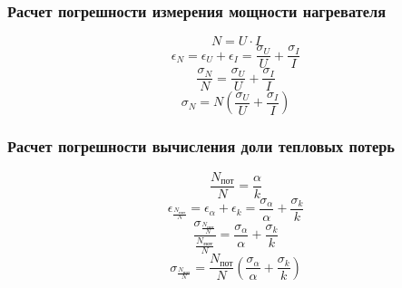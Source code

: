 \subsubsection{Расчет погрешности измерения мощности нагревателя}
\[N = U \cdot I\]
\[\epsilon_N = \epsilon_U + \epsilon_I = \frac{\sigma_U}{U} + \frac{\sigma_I}{I}\]
\[\frac{\sigma_N}{N} = \frac{\sigma_U}{U} + \frac{\sigma_I}{I}\]
\[\sigma_N = N(\frac{\sigma_U}{U} + \frac{\sigma_I}{I})\]
\subsubsection{Расчет погрешности вычисления доли тепловых потерь}
\[\frac{N_\text{пот}}{N} = \frac{\alpha}{k}\]
\[\epsilon_{\frac{N_\text{пот}}{N}} = \epsilon_\alpha + \epsilon_k = \frac{\sigma_\alpha}{\alpha} + \frac{\sigma_k}{k}\]
\[\frac{\sigma_{\frac{N_\text{пот}}{N}}}{\frac{N_\text{пот}}{N}} = \frac{\sigma_\alpha}{\alpha} + \frac{\sigma_k}{k}\]
\[\sigma_{\frac{N_\text{пот}}{N}} = \frac{N_\text{пот}}{N}(\frac{\sigma_\alpha}{\alpha} + \frac{\sigma_k}{k})\]